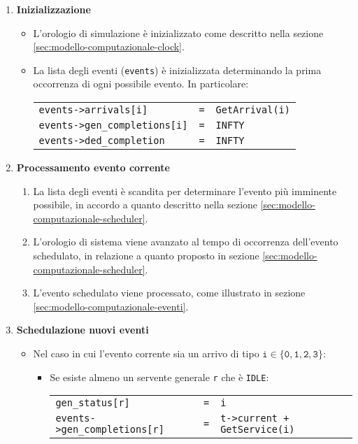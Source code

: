 \begin{enumerate}[label=Step \arabic*), align=left, leftmargin=*]
\item \textbf{Inizializzazione}
\begin{itemize}
\item L'orologio di simulazione è inizializzato come descritto nella sezione \ref{sec:modello-computazionale-clock}.
\item La lista degli eventi (\texttt{events}) è inizializzata determinando la prima occorrenza di ogni possibile evento. In particolare:
\begin{center}
\begin{tabular}{l l l}
\texttt{events->arrivals[i]} & \texttt{=} & \texttt{GetArrival(i)} \\
\texttt{events->gen\_completions[i]} & \texttt{=} & \texttt{INFTY} \\
\texttt{events->ded\_completion} & \texttt{=} & \texttt{INFTY}
\end{tabular}
\end{center}
\end{itemize}
\item \textbf{Processamento evento corrente}
\begin{enumerate}
\item La lista degli eventi è scandita per determinare l'evento più imminente possibile, in accordo a quanto descritto nella sezione \ref{sec:modello-computazionale-scheduler}.
\item L'orologio di sistema viene avanzato al tempo di occorrenza dell'evento schedulato, in relazione a quanto proposto in sezione \ref{sec:modello-computazionale-scheduler}.
\item L'evento schedulato viene processato, come illustrato in sezione \ref{sec:modello-computazionale-eventi}.
\end{enumerate}
\item \textbf{Schedulazione nuovi eventi}
\begin{itemize}
\item Nel caso in cui l'evento corrente sia un arrivo di tipo $\mathtt{i \in \lbrace 0, 1, 2, 3 \rbrace}$:
\begin{itemize}
\item Se esiste almeno un servente generale \texttt{r} che è \texttt{IDLE}:
\begin{center}
\begin{tabular}{l l l}
\texttt{gen\_status[r]} & \texttt{=} & \texttt{i} \\
\texttt{events->gen\_completions[r]} & \texttt{=} & \texttt{t->current + GetService(i)}

\end{tabular}
\end{center}
\end{itemize}
\end{itemize}
\end{enumerate}
